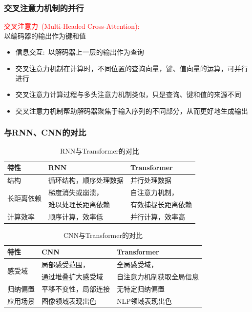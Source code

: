 \begin{frame}
    \frametitle{交叉注意力机制的并行}
\textcolor{red}{交叉注意力~\textrm{(Multi-Headed Cross-Attention):}}\\
以编码器的输出作为键和值
    \begin{itemize}
		\setlength{\itemsep}{10pt}
        \item 信息交互:~以解码器上一层的输出作为查询
\vskip 1pt
		{\fontsize{7.2pt}{6.2pt}\selectfont{通过计算注意力分数，解码器可以从编码器的输出中获取相关的上下文信息}}
	\item 交叉注意力机制在计算时，不同位置的查询向量，键、值向量的运算，可并行进行
        \item 交叉注意力计算过程与多头注意力机制类似，只是查询、键和值的来源不同
	\item 交叉注意力机制帮助解码器聚焦于输入序列的不同部分，从而更好地生成输出
    \end{itemize}
\end{frame}

\begin{frame}
	\frametitle{与\textrm{RNN}、\textrm{CNN}的对比}
	\renewcommand{\arraystretch}{1.1} %
    \begin{table}[ht]
        \centering
        \begin{tabular}{lll}
    \toprule
	    特性 & \textrm{RNN} & \textrm{Transformer} \\
            \midrule
            结构 & 循环结构，顺序处理数据 & 并行处理数据 \\
            \hline
	    \multirow{2}{*}{长距离依赖} & 梯度消失或崩溃， & 自注意力机制， \\
		    &难以处理长距离依赖 &有效捕捉长距离依赖 \\
            \hline
            计算效率 & 顺序计算，效率低 & 并行计算，效率高 \\
            \bottomrule
        \end{tabular}
	\caption{\tiny{\textrm{RNN}与\textrm{Transformer}的对比}}
    \end{table}
    \vskip -13pt
    \begin{table}[ht]
        \centering
        \begin{tabular}{lll}
    \toprule
	    特性 & \textrm{CNN} & \textrm{Transformer} \\
            \midrule
	    \multirow{2}{*}{感受域} & 局部感受范围，& 全局感受域，\\
	    & 通过堆叠扩大感受域 & 自注意力机制获取全局信息 \\
            \hline
            归纳偏置 & 平移不变性，局部连接 & 无特定归纳偏置 \\
            \hline
	    应用场景 & 图像领域表现出色 & \textrm{NLP}领域表现出色 \\
            \bottomrule
        \end{tabular}
	\caption{\tiny{\textrm{CNN}与\textrm{Transformer}的对比}}
    \end{table}
\end{frame}

%
